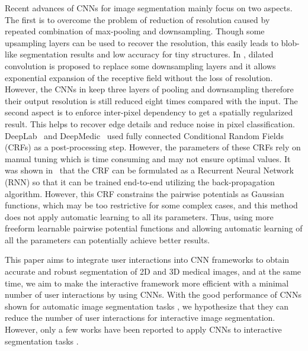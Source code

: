 \documentclass[10pt,journal,compsoc]{IEEEtran}
\begin{document}
Recent advances of CNNs for image segmentation mainly focus on two aspects. The first is to overcome the problem of reduction of resolution caused by repeated combination of max-pooling and downsampling. %
 Though some upsampling layers can be used to recover the resolution, this easily leads to blob-like segmentation results and low accuracy for tiny structures\cite{Long2014}. In \cite{Onvolutions2016, Chen2015iclr}, dilated convolution is proposed to replace some downsampling layers and it allows exponential expansion of the receptive field without the loss of resolution. However, the CNNs in \cite{Onvolutions2016,Chen2015iclr} keep three layers of pooling and downsampling therefore their output resolution is still reduced eight times compared with the input. The second aspect is to enforce inter-pixel dependency to get a spatially regularized result. %
 This helps to recover edge details and reduce noise in pixel classification. DeepLab~\cite{Chen2016deeplab} and DeepMedic~\cite{Kamnitsas2017} used fully connected Conditional Random Fields (CRFs) as a post-processing step. However, the parameters of these CRFs rely on manual tuning which is time consuming and may not ensure optimal values. It was shown in~\cite{Zheng2015a} that the CRF can be formulated as a Recurrent Neural Network (RNN) so that it can be trained end-to-end utilizing the back-propagation algorithm. However, this CRF constrains the pairwise potentials as Gaussian functions, which may be too restrictive for some complex cases, and this method does not apply automatic learning to all its parameters. Thus, using more freeform learnable pairwise potential functions and allowing automatic learning of all the parameters can potentially achieve better results.  


This paper aims to integrate user interactions into CNN frameworks to obtain accurate and robust segmentation of 2D and 3D medical images, and at the same time, we aim to make the interactive framework more efficient with a minimal number of user interactions by using CNNs. With the good performance of CNNs shown for automatic image segmentation tasks \cite{Girshick2014, Long2014, Chen2016deeplab, Havaei2016, Kamnitsas2017}, we hypothesize that they can reduce the number of user interactions for interactive image segmentation. However, only a few works have been reported to apply CNNs to interactive segmentation tasks \cite{Abdulkadir2016,Lin2016,Rajchl2016,Xu2016}. 
\end{document}
